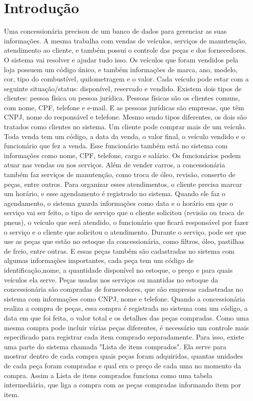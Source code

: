 \documentclass{article}
\begin{document}
\section{Introdução}
Uma concessionária precisou de um banco de dados para gerenciar as suas informações. A mesma trabalha com vendas de veículos, serviços de manutenção, atendimento ao cliente, e também possui o controle das peças e dos fornecedores. O sistema vai resolver e ajudar tudo isso.  
Os veículos que foram vendidos pela loja possuem um código único, e também informações de marca, ano, modelo, cor, tipo do combustível, quilometragem e o valor. Cada veículo pode estar com a seguinte situação/status: disponível, reservado e vendido.
Existem dois tipos de clientes: pessoa física ou pessoa jurídica. Pessoas físicas são os clientes comuns, com nome, CPF, telefone e e-mail. E as pessoas jurídicas são empresas, que têm CNPJ, nome do responsável e telefone. Mesmo sendo tipos diferentes, os dois são tratados como clientes no sistema. Um cliente pode comprar mais de um veículo. Toda venda tem um código, a data da venda, o valor final, o veículo vendido e o funcionário que fez a venda. Esse funcionário também está no sistema com informações como nome, CPF, telefone, cargo e salário. Os funcionários podem atuar nas vendas ou nos serviços.
Além de vender carros, a concessionária também faz serviços de manutenção, como troca de óleo, revisão, conserto de peças, entre outros. Para organizar esses atendimentos, o cliente precisa marcar um horário, e esse agendamento é registrado no sistema.
Quando ele faz o agendamento, o sistema guarda informações como data e o horário em que o serviço vai ser feito, o tipo de serviço que o cliente solicitou (revisão ou troca de pneus), o veículo que será atendido, o funcionário que ficará responsável por fazer o serviço e o cliente que solicitou o atendimento.
Durante o serviço, pode ser que use as peças que estão no estoque da concessionária, como filtros, óleo, pastilhas de freio, entre outras. E essas peças também são cadastradas no sistema com algumas informações importantes, cada peça tem um código de identificação,nome, a quantidade disponível no estoque, o preço e para quais veículos ela serve.
Peças usadas nos serviços ou mantidas no estoque da concessionária são compradas de fornecedores, que são empresas cadastradas no sistema com informações como CNPJ, nome e telefone. Quando a concessionária realiza a compra de peças, essa compra é registrada no sistema com um código, a data em que foi feita, o valor total e os detalhes das peças compradas.
Como uma mesma compra pode incluir várias peças diferentes, é necessário um controle mais especificado para registrar cada item comprado separadamente. Para isso, existe uma parte do sistema chamada "Lista de itens comprados". Ela serve para mostrar dentro de cada compra quais peças foram adquiridas, quantas unidades de cada peça foram compradas e qual era o preço de cada uma no momento da compra. Assim a Lista de itens comprados funciona como uma tabela intermediária, que liga a compra com as peças compradas informando item por item.


\newpage
\end{document}
